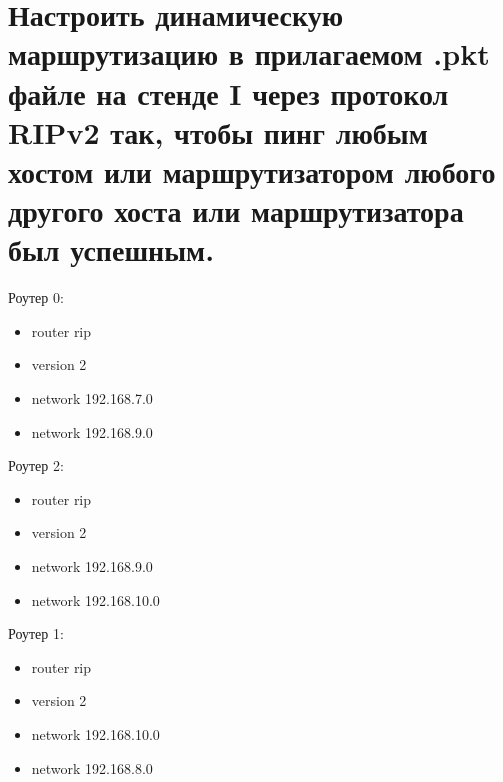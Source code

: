 \documentclass[a4paper,12pt]{article}
\begin{document}
	\newpage

	\section{Настроить динамическую маршрутизацию в прилагаемом .pkt файле на стенде I через протокол RIPv2 так, чтобы пинг любым хостом или маршрутизатором любого другого хоста или маршрутизатора был успешным.}
	
	Роутер 0:
	
	\begin{itemize}
		\item router rip
		\item version 2
		\item network 192.168.7.0
		\item network 192.168.9.0
	\end{itemize}

Роутер 2:

\begin{itemize}
	\item router rip
	\item version 2
	\item network 192.168.9.0
	\item network 192.168.10.0
\end{itemize}

Роутер 1:

\begin{itemize}
	\item router rip
	\item version 2
	\item network 192.168.10.0
	\item network 192.168.8.0
\end{itemize}

\newpage
\end{document}
